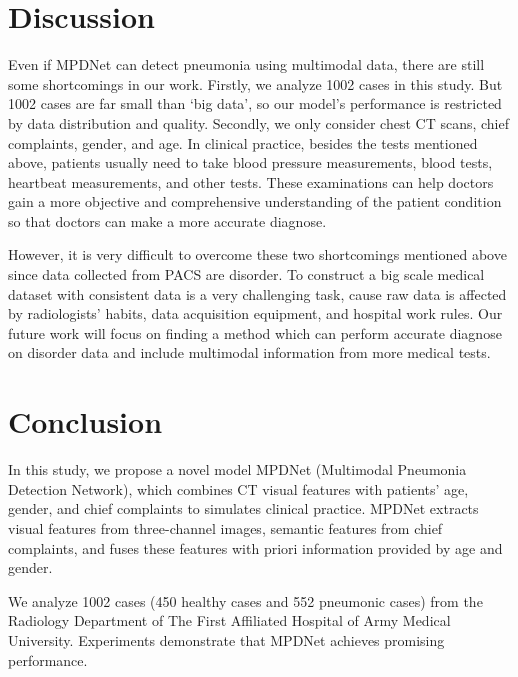 \documentclass[journal]{IEEEtran}
\begin{document}
\section{Discussion}
Even if MPDNet can detect pneumonia using multimodal data, there are still some shortcomings in our work.
Firstly, we analyze 1002 cases in this study. But 1002 cases are far small than `big data', so our model's performance is restricted by data distribution and quality. 
Secondly, we only consider chest CT scans, chief complaints, gender, and age. In clinical practice, besides the tests mentioned above, patients usually need to take blood pressure measurements, blood tests, heartbeat measurements, and other tests. These examinations can help doctors gain a more objective and comprehensive understanding of the patient condition so that doctors can make a more accurate diagnose.

However, it is very difficult to overcome these two shortcomings mentioned above since data collected from PACS are disorder. To construct a big scale medical dataset with consistent data is a very challenging task, cause raw data is affected by radiologists' habits, data acquisition equipment, and hospital work rules. 
Our future work will focus on finding a method which can perform accurate diagnose on disorder data and include multimodal information from more medical tests.

\section{Conclusion}
\label{conclude}
In this study, we propose a novel model MPDNet (Multimodal Pneumonia Detection Network), which combines CT visual features with patients' age, gender, and chief complaints to simulates clinical practice. 
MPDNet extracts visual features from three-channel images, semantic features from chief complaints, and fuses these features with priori information provided by age and gender.

We analyze 1002 cases (450 healthy cases and 552 pneumonic cases) from the Radiology Department of The First Affiliated Hospital of Army Medical University. Experiments demonstrate that MPDNet achieves promising performance.
\end{document}
